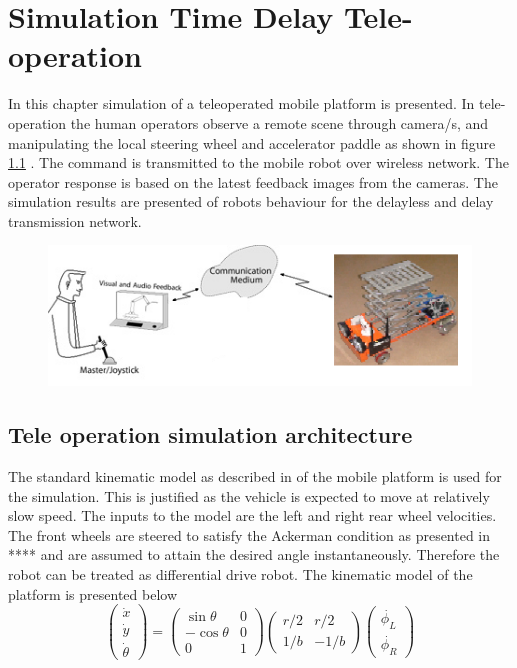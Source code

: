 
\chapter{Simulation Time Delay Tele-operation}
\label{c7_DI_equimomental}
In this chapter simulation of a teleoperated mobile platform is presented. In tele-operation the human operators observe a remote scene through camera/s, and manipulating the local steering wheel and accelerator paddle as shown in figure \ref{fig:teleoperation} . The command is transmitted to the mobile robot over wireless network. The operator response is based on the latest feedback images from the cameras. The simulation results are presented of robots behaviour for the delayless and delay transmission network.
\begin{figure}
	\includegraphics[width=\linewidth,keepaspectratio]{Chapter6/fig/teleoperation}
	\label{fig:teleoperation} 
\end{figure}

\section{Tele operation simulation architecture}
The standard kinematic model as described in \cite{campion1996structural} of the mobile platform is used for the simulation. This is justified as  the vehicle is expected to move at relatively slow speed. The inputs to the model are the left and right rear wheel velocities. The front wheels are steered to satisfy the Ackerman condition as presented in **** and are assumed to attain the desired angle instantaneously. Therefore the robot can be treated as differential drive robot.  The kinematic model of the platform is presented below
\begin{equation}
\begin{pmatrix}
\dot{x}\\ 
\dot{y}\\ 
\dot{\theta}
\end{pmatrix}
=
\begin{pmatrix}
\sin \theta & 0 \\
-\cos \theta & 0 \\
0& 1
\end{pmatrix}
\begin{pmatrix}
r/2 & r/2\\
1/b & -1/b
\end{pmatrix}
\begin{pmatrix}
\dot{\phi_L}\\
\dot{\phi_R}
\end{pmatrix}
\end{equation}


